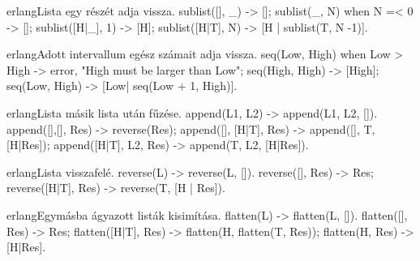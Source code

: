 \documentclass[12pt, a4paper, oneside]{book}
\begin{document}
\begin{code}{erlang}{Lista egy részét adja vissza.}
sublist([], _) ->
  [];
sublist(_, N) when N =< 0 ->
  [];
sublist([H|_], 1) ->
  [H];
sublist([H|T], N) ->
  [H | sublist(T, N -1)].
\end{code}

\begin{code}{erlang}{Adott intervallum egész számait adja vissza.}
seq(Low, High) when Low > High ->
  {error, "High must be larger than Low"};
seq(High, High) ->
  [High];
seq(Low, High) ->
  [Low| seq(Low + 1, High)].
\end{code}

\begin{code}{erlang}{Lista másik lista után fűzése.}
append(L1, L2) ->
  append(L1, L2, []).
append([],[], Res) -> reverse(Res);
append([], [H|T], Res) ->
  append([], T, [H|Res]);
append([H|T], L2, Res) ->
  append(T, L2, [H|Res]).
\end{code}

\begin{code}{erlang}{Lista visszafelé.}
reverse(L) ->
  reverse(L, []).
reverse([], Res) ->
  Res;
reverse([H|T], Res) ->
  reverse(T, [H | Res]).
\end{code}

\newpage
\begin{code}{erlang}{Egymásba ágyazott listák kisimítása.}
flatten(L) -> flatten(L, []).
flatten([], Res) -> Res;
flatten([H|T], Res) ->
  flatten(H, flatten(T, Res));
flatten(H, Res) ->
  [H|Res].
\end{code}
\end{document}
